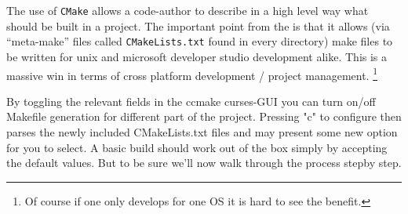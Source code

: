 \documentclass[a4paper,10pt]{article}
\newcommand{\Code}[1]{\texttt{#1} }
\newcommand{\code}[1]{\Code{#1} }
\begin{document}
The use of \code{CMake} allows a code-author to describe in a high
level way what should be built in a project. The important point
from the is that it allows (via ``meta-make'' files called
\code{CMakeLists.txt} found in every directory) make files to be
written for unix and microsoft developer studio development alike.
This is a massive win in terms of cross platform development /
project management. \footnote{Of course if one only develops for
one OS it is hard to see the benefit.}


By toggling the relevant fields in the ccmake curses-GUI you can
turn on/off Makefile generation for different part of the project.
Pressing "c" to configure then parses the newly included
CMakeLists.txt files and may present some new option for you to
select. A basic build should work out of the box simply by accepting the default values.  But to be sure we'll now walk through the process stepby step.
\end{document}
